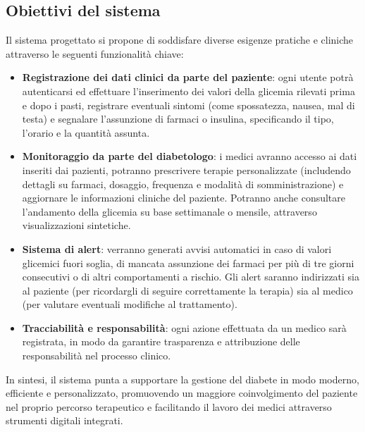 \subsection{Obiettivi del sistema}
Il sistema progettato si propone di soddisfare diverse esigenze pratiche e cliniche attraverso le seguenti funzionalità chiave:
\begin{itemize}
    \item \textbf{Registrazione dei dati clinici da parte del paziente}: ogni utente potrà autenticarsi ed effettuare l’inserimento dei valori della glicemia rilevati prima e dopo i pasti, registrare eventuali sintomi (come spossatezza, nausea, mal di testa) e segnalare l’assunzione di farmaci o insulina, specificando il tipo, l’orario e la quantità assunta.
    \item \textbf{Monitoraggio da parte del diabetologo}: i medici avranno accesso ai dati inseriti dai pazienti, potranno prescrivere terapie personalizzate (includendo dettagli su farmaci, dosaggio, frequenza e modalità di somministrazione) e aggiornare le informazioni cliniche del paziente. Potranno anche consultare l’andamento della glicemia su base settimanale o mensile, attraverso visualizzazioni sintetiche.
    \item \textbf{Sistema di alert}: verranno generati avvisi automatici in caso di valori glicemici fuori soglia, di mancata assunzione dei farmaci per più di tre giorni consecutivi o di altri comportamenti a rischio. Gli alert saranno indirizzati sia al paziente (per ricordargli di seguire correttamente la terapia) sia al medico (per valutare eventuali modifiche al trattamento).
    \item \textbf{Tracciabilità e responsabilità}: ogni azione effettuata da un medico sarà registrata, in modo da garantire trasparenza e attribuzione delle responsabilità nel processo clinico.
\end{itemize}
In sintesi, il sistema punta a supportare la gestione del diabete in modo moderno, efficiente e personalizzato, promuovendo un maggiore coinvolgimento del paziente nel proprio percorso terapeutico e facilitando il lavoro dei medici attraverso strumenti digitali integrati.